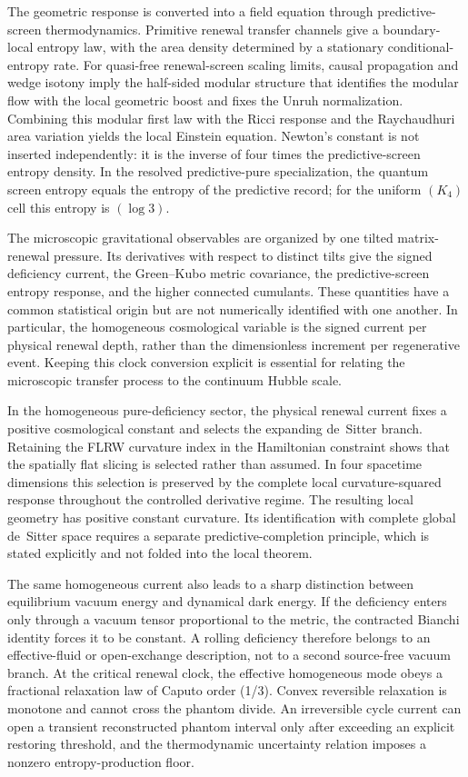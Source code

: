 \documentclass[11pt]{article}
\theoremstyle{definition}
\theoremstyle{remark}
\begin{document}
The geometric response is converted into a field equation through predictive-screen thermodynamics.  Primitive renewal transfer channels give a boundary-local entropy law, with the area density determined by a stationary conditional-entropy rate.  For quasi-free renewal-screen scaling limits, causal propagation and wedge isotony imply the half-sided modular structure that identifies the modular flow with the local geometric boost and fixes the Unruh normalization.  Combining this modular first law with the Ricci response and the Raychaudhuri area variation yields the local Einstein equation.  Newton's constant is not inserted independently: it is the inverse of four times the predictive-screen entropy density.  In the resolved predictive-pure specialization, the quantum screen entropy equals the entropy of the predictive record; for the uniform $(K_4)$ cell this entropy is $(\log 3)$.

The microscopic gravitational observables are organized by one tilted matrix-renewal pressure.  Its derivatives with respect to distinct tilts give the signed deficiency current, the Green--Kubo metric covariance, the predictive-screen entropy response, and the higher connected cumulants.  These quantities have a common statistical origin but are not numerically identified with one another.  In particular, the homogeneous cosmological variable is the signed current per physical renewal depth, rather than the dimensionless increment per regenerative event.  Keeping this clock conversion explicit is essential for relating the microscopic transfer process to the continuum Hubble scale.

In the homogeneous pure-deficiency sector, the physical renewal current fixes a positive cosmological constant and selects the expanding de~Sitter branch.  Retaining the FLRW curvature index in the Hamiltonian constraint shows that the spatially flat slicing is selected rather than assumed.  In four spacetime dimensions this selection is preserved by the complete local curvature-squared response throughout the controlled derivative regime.  The resulting local geometry has positive constant curvature.  Its identification with complete global de~Sitter space requires a separate predictive-completion principle, which is stated explicitly and not folded into the local theorem.

The same homogeneous current also leads to a sharp distinction between equilibrium vacuum energy and dynamical dark energy.  If the deficiency enters only through a vacuum tensor proportional to the metric, the contracted Bianchi identity forces it to be constant.  A rolling deficiency therefore belongs to an effective-fluid or open-exchange description, not to a second source-free vacuum branch.  At the critical renewal clock, the effective homogeneous mode obeys a fractional relaxation law of Caputo order (1/3).  Convex reversible relaxation is monotone and cannot cross the phantom divide.  An irreversible cycle current can open a transient reconstructed phantom interval only after exceeding an explicit restoring threshold, and the thermodynamic uncertainty relation imposes a nonzero entropy-production floor.
\end{document}
